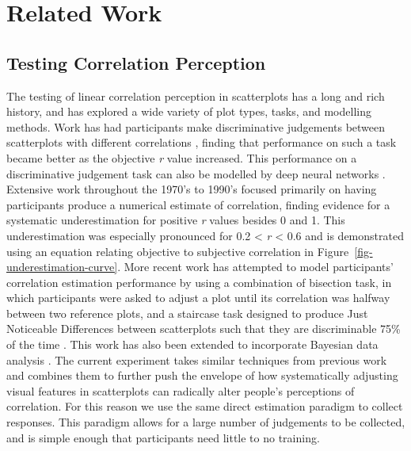 \documentclass[manuscript, review, anonymous, screen]{acmart}
\begin{document}
\hypertarget{sec-related-work}{%
\section{Related Work}\label{sec-related-work}}

\hypertarget{sec-testing-corr-percept}{%
\subsection{Testing Correlation
Perception}\label{sec-testing-corr-percept}}

The testing of linear correlation perception in scatterplots has a long
and rich history, and has explored a wide variety of plot types, tasks,
and modelling methods. Work has had participants make discriminative
judgements between scatterplots with different correlations
\citep{pollack_1960, doherty_2007}, finding that performance on such a
task became better as the objective \emph{r} value increased. This
performance on a discriminative judgement task can also be modelled by
deep neural networks \citep{yang_2023}. Extensive work throughout the
1970's to 1990's focused primarily on having participants produce a
numerical estimate of correlation, finding evidence for a systematic
underestimation for positive \emph{r} values besides 0 and 1. This
underestimation was especially pronounced for 0.2 \textless{} \emph{r}
\textless{} 0.6
\citep{strahan_1978, bobko_1979, cleveland_1982, lane_1985, lauer_1989, collyer_1990, meyer_1992}
and is demonstrated using an equation relating objective to subjective
correlation \citep{rensink_2017} in
Figure~\ref{fig-underestimation-curve}. More recent work has attempted
to model participants' correlation estimation performance by using a
combination of bisection task, in which participants were asked to
adjust a plot until its correlation was halfway between two reference
plots, and a staircase task designed to produce Just Noticeable
Differences between scatterplots such that they are discriminable 75\%
of the time \citep{rensink_2010}. This work has also been extended to
incorporate Bayesian data analysis \citep{kay_2015}. The current
experiment takes similar techniques from previous work
\citep{strain_2023, strain_2023b} and combines them to further push the
envelope of how systematically adjusting visual features in scatterplots
can radically alter people's perceptions of correlation. For this reason
we use the same direct estimation paradigm to collect responses. This
paradigm allows for a large number of judgements to be collected, and is
simple enough that participants need little to no training.
\end{document}
